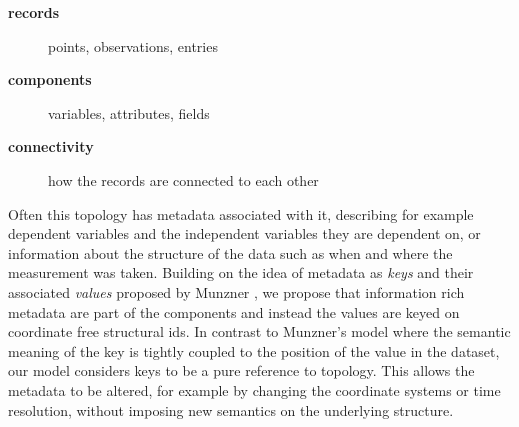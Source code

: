 \documentclass[../main.tex]{subfiles}
\begin{document}
\begin{mdframed}[roundcorner=10pt, frametitle= definitions, frametitlerule=true, frametitlebackgroundcolor=gray!10]
    \begin{description}
        \item[\textbf{records}] points, observations, entries 
        \item[\textbf{components}] variables, attributes, fields 
        \item[\textbf{connectivity}] how the records are connected to each other
    \end{description}
\end{mdframed}

Often this topology has metadata associated with it, describing for example dependent variables and the independent variables they are dependent on, or information about the structure of the data such as when and where the measurement was taken. Building on the idea of metadata as \textit{keys} and their associated \textit{values} proposed by Munzner \cite{munznerChDataAbstraction}, we propose that information rich metadata are part of the components and instead the values are keyed on coordinate free structural ids. In contrast to Munzner's model where the semantic meaning of the key is tightly coupled to the position of the value in the dataset, our model considers keys to be a pure reference to topology. This allows the metadata to be altered, for example by changing the coordinate systems or time resolution, without imposing new semantics on the underlying structure.
\end{document}
